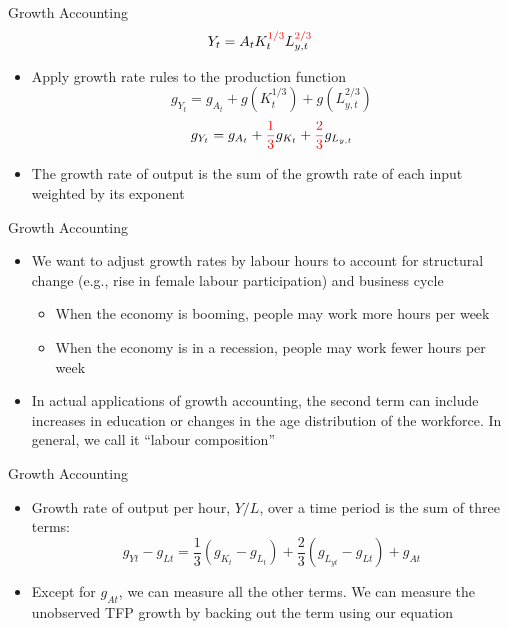 \documentclass[aspectratio=1610]{beamer}
\begin{document}
\begin{frame}[wide]{Growth Accounting}
	\[Y_t= A_t K_t^{\textcolor{red}{1/3}}L_{y,t}^{\textcolor{red}{2/3}}\]
	\begin{itemize}
		\item Apply growth rate rules to the production function
		\[g_{Y_t}= g_{A_t} + g(K_t^{1/3}) + g(L_{y,t}^{2/3})\]
		\[g_{Y_t}= g_{A_t} + \textcolor{red}{\frac{1}{3}}g_{K_t} + \textcolor{red}{\frac{2}{3}}g_{L_{y,t}}\]
		\item The growth rate of output is the sum of the growth rate of each input weighted by its exponent
	\end{itemize}
\end{frame}

\begin{frame}[wide]{Growth Accounting}
	\begin{itemize}
		\item We want to adjust growth rates by labour hours to account for structural change (e.g., rise in female labour participation) and business cycle
		\vspace{2mm}
		\begin{itemize}
			\item 	When the economy is booming, people may work more hours per week
			\item When the economy is in a recession, people may work fewer hours per week
		\end{itemize}
		\vspace{2mm}
		\item In actual applications of growth accounting, the second term can include increases in education or changes in the age distribution of the workforce. In general, we call it “labour composition''
	\end{itemize}
\end{frame}

\begin{frame}[wide]{Growth Accounting}
	\begin{itemize}
		\item Growth rate of output per hour, $Y /L$, over a time period is the sum of three terms:
		\[g_{Yt} - g_{Lt} = \frac{1}{3}(g_{K_t} - g_{L_t}) + \frac{2}{3}(g_{L_{yt}} - g_{Lt}) + g_{At}\]
		
		\vspace{4mm}
		\item Except for $g_{At}$, we can measure all the other terms. We can measure the unobserved TFP growth by backing out the term using our equation
		
	\end{itemize}
\end{frame}
\end{document}
